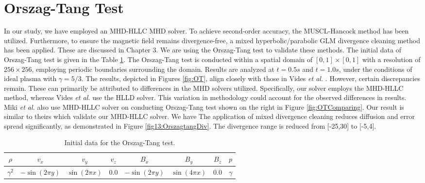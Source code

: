 \section{Orszag-Tang Test}
In our study, we have employed an MHD-HLLC MHD solver. To achieve second-order accuracy, the MUSCL-Hancock method has been utilized. Furthermore, to ensure the magnetic field remains divergence-free, a mixed hyperbolic/parabolic GLM divergence cleaning method has been applied. These are discussed in Chapter 3. We are using the Orszag-Tang test to validate these methods. The initial data of Orszag-Tang test is given in the Table \ref{tab:OrszagTangInitial}. The Orszag-Tang test is conducted within a spatial domain of $[0,1] \times [0,1]$ with a resolution of $256 \times 256$, employing periodic boundaries surrounding the domain. Results are analyzed at $t=0.5s$ and $t=1.0s$, under the conditions of ideal plasma with $\gamma = 5/3$. The results, depicted in Figures \ref{fig:OT}, align closely with those in Vides \textit{et al.} \cite{vides2013divergence}. However, certain discrepancies remain. These can primarily be attributed to differences in the MHD solvers utilized. Specifically, our solver employs the MHD-HLLC method, whereas Vides \textit{et al.} use the HLLD solver. This variation in methodology could account for the observed differences in results. Miki \textit{et al.} also use MHD-HLLC solver on conducting Orszag-Tang test shown on the right in Figure \ref{fig:OTComparing}. Our result is similar to theirs which validate our MHD-HLLC solver. We have The application of mixed divergence cleaning reduces diffusion and error spread significantly, as demonstrated in Figure \ref{fig13:OrszagtangDiv}. The divergence range is reduced from  [-25,30] to [-5,4].
\begin{table}[H]
\caption{Initial data for the Orszag-Tang test. }
\label{tab:OrszagTangInitial}
\centering 
\begin{tabularx}{0.8\textwidth}{@{}cccccccc@{}}
\toprule
$\rho$ & $v_x$ & $v_y$ & $v_z$  & $B_x$ & $B_y$ & $B_z$ & $p$ \\
\hline
$\gamma^2$ & $-\sin(2\pi y)$ & $\sin(2\pi x)$ & 0.0 & $-\sin(2\pi y)$ & $\sin(4\pi x)$ & $0.0$ & $\gamma$ \\
\bottomrule
\end{tabularx}
\end{table}

